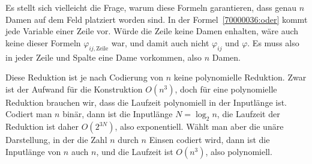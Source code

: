 \begin{diskussion}
Es stellt sich vielleicht die Frage, warum diese Formeln garantieren, dass
genau $n$ Damen auf dem Feld platziert worden sind.
In der Formel~\eqref{70000036:oder} kommt jede Variable einer Zeile vor.
Würde die Zeile keine Damen enhalten, wäre auch keine dieser
Formeln $\varphi_{ij,\text{Zeile}}$ war, und damit auch nicht $\varphi_{ij}$
und $\varphi$.
Es muss also in jeder Zeile und Spalte eine Dame vorkommen, also $n$
Damen.

Diese Reduktion ist je nach Codierung von $n$ keine polynomielle Reduktion.
Zwar ist der Aufwand für die Konstruktion $O(n^3)$, doch für eine
polynomielle Reduktion brauchen wir, dass die Laufzeit polynomiell in
der Inputlänge ist.
Codiert man $n$ binär, dann ist die Inputlänge $N=\log_2n$, die Laufzeit
der Reduktion ist daher $O(2^{3N})$, also exponentiell.
Wählt man aber die unäre Darstellung, in der die Zahl $n$ durch $n$ Einsen
codiert wird, dann ist die Inputlänge von $n$ auch $n$, und die Laufzeit
ist $O(n^ 3)$, also polynomiell.
\end{diskussion}


